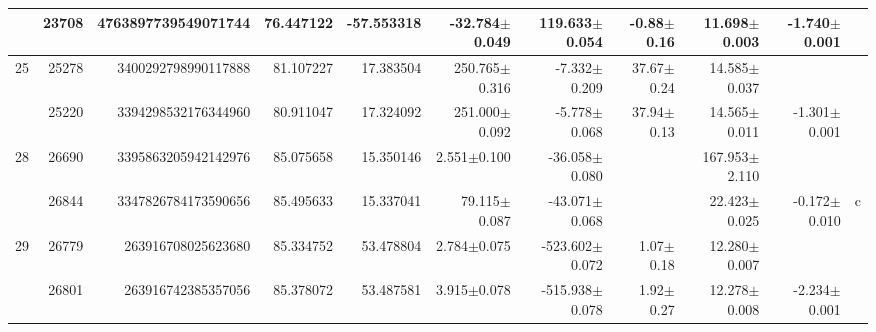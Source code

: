 \documentclass{ws-ijmpd}
\begin{document}
\begin{landscape}
\begin{longtable}{rrrrrrrrrrl}
            &   23708 &      4763897739549071744 &                    76.447122 &                   -57.553318 &                -32.784$\pm$0.049 &                119.633$\pm$0.054 &          -0.88$\pm$  0.16 &        11.698$\pm$0.003 &                          -1.740$\pm$0.001 &                                                    \\
  \hline 25 &   25278 &      3400292798990117888 &                    81.107227 &                    17.383504 &                250.765$\pm$0.316 &                 -7.332$\pm$0.209 &          37.67$\pm$  0.24 &        14.585$\pm$0.037 &                                           &                                                    \\
            &   25220 &      3394298532176344960 &                    80.911047 &                    17.324092 &                251.000$\pm$0.092 &                 -5.778$\pm$0.068 &          37.94$\pm$  0.13 &        14.565$\pm$0.011 &                          -1.301$\pm$0.001 &                                                    \\
  \hline 28 &   26690 &      3395863205942142976 &                    85.075658 &                    15.350146 &                  2.551$\pm$0.100 &                -36.058$\pm$0.080 &                           &       167.953$\pm$2.110 &                                           &                                                    \\
            &   26844 &      3347826784173590656 &                    85.495633 &                    15.337041 &                 79.115$\pm$0.087 &                -43.071$\pm$0.068 &                           &        22.423$\pm$0.025 &                          -0.172$\pm$0.010 &                                                  c \\
  \hline 29 &   26779 &       263916708025623680 &                    85.334752 &                    53.478804 &                  2.784$\pm$0.075 &               -523.602$\pm$0.072 &           1.07$\pm$  0.18 &        12.280$\pm$0.007 &                                           &                                                    \\
            &   26801 &       263916742385357056 &                    85.378072 &                    53.487581 &                  3.915$\pm$0.078 &               -515.938$\pm$0.078 &           1.92$\pm$  0.27 &        12.278$\pm$0.008 &                          -2.234$\pm$0.001 &                                                    \\

\end{longtable}
\end{landscape}
\end{document}
